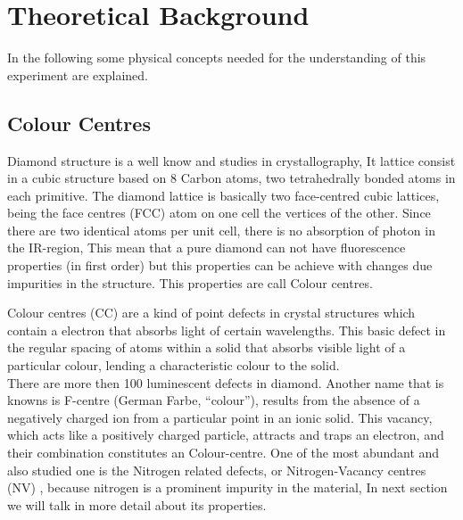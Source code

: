 \section{Theoretical Background}
In the following some physical concepts needed for the understanding of this experiment are explained.
\subsection{Colour Centres}




Diamond structure is a well know and studies in crystallography, It lattice consist in a cubic structure based on 8 Carbon atoms, two tetrahedrally bonded atoms in each primitive. The diamond lattice is basically two face-centred cubic lattices, being the face centres (FCC) atom on one cell the vertices of the other. Since there are two  identical atoms per unit cell, there is no absorption of photon in the IR-region, This mean that a pure diamond can not have fluorescence properties (in first order) but this properties can be achieve with changes due impurities in the structure. This properties are call Colour centres.

Colour centres (CC) are a kind of point defects in crystal structures which contain a electron that absorbs light of certain wavelengths. This basic defect in the regular spacing of atoms within a solid that absorbs visible light of a particular colour, lending a characteristic colour to the solid. \\

There are more then 100 luminescent defects in diamond. Another name that is knowns is F-centre (German Farbe, “colour”), results from the absence of a negatively charged ion from a particular point in an ionic solid. This vacancy, which acts like a positively charged particle, attracts and traps an electron, and their combination constitutes an Colour-centre.  One of the most abundant and also  studied one is the  Nitrogen related defects, or Nitrogen-Vacancy centres (NV) , because  nitrogen is a prominent impurity in the material, In next section we will talk in more detail about its properties.


